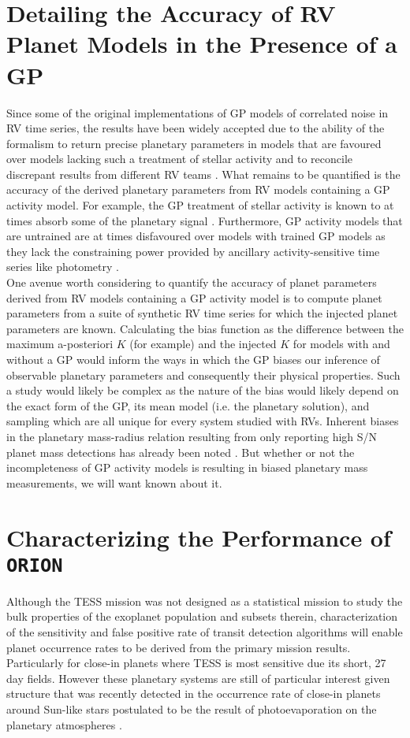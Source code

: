 \section{Detailing the Accuracy of RV Planet Models in the Presence of a GP}
Since some of the original implementations of GP models of correlated noise in
RV time series, the results have been widely accepted due to the ability of the
formalism to return precise planetary parameters in models that are favoured
over models lacking such a treatment of stellar activity
\citep{haywood14,rajpaul15} and to reconcile discrepant results from different
RV teams \citep{rajpaul17,cloutier19a}. What remains to be quantified is the accuracy of
the derived planetary parameters from RV models containing a GP activity model. For
example, the GP treatment of stellar activity is known to at times absorb some
of the planetary signal \citep[e.g.][]{ribas18}. Furthermore, GP activity models
that are untrained are at times disfavoured over models with trained GP models
as they lack the
constraining power provided by ancillary activity-sensitive time series like
photometry \citep{cloutier17b}. \\

One avenue worth considering to quantify the accuracy of planet parameters
derived from
RV models containing a GP activity model is to compute planet parameters
from a suite of synthetic RV time series for which the injected planet
parameters are known. Calculating the bias function as the difference between
the maximum a-posteriori $K$ (for example) and the injected $K$ for models with
and without a GP would inform the ways in which the GP biases our inference of
observable planetary parameters and consequently their physical properties.
Such a study would likely be complex as the nature of the bias would likely depend
on the exact form of the GP, its mean model (i.e. the planetary solution), and
sampling which are all unique for every system studied with RVs.
Inherent biases in the planetary mass-radius relation resulting from only
reporting high S/N planet mass detections has already been noted \citep{burt18}.
But whether or not the incompleteness of GP activity models is resulting in biased
planetary mass measurements, we will want known about it.


\section{Characterizing the Performance of \texttt{ORION}}
Although the TESS mission was not designed as a statistical mission to study
the bulk properties of the exoplanet population and subsets therein,
characterization of the sensitivity and false positive rate of transit detection
algorithms will enable planet occurrence rates to be derived from the primary
mission results. Particularly
for close-in planets where TESS is most sensitive due its short, 27 day fields.
However these planetary systems are still of particular interest given structure
that was recently detected in the occurrence rate of close-in planets around
Sun-like stars postulated to be the result of photoevaporation on the planetary
atmospheres \cite{owen13,fulton17,vaneylen18}. \\

